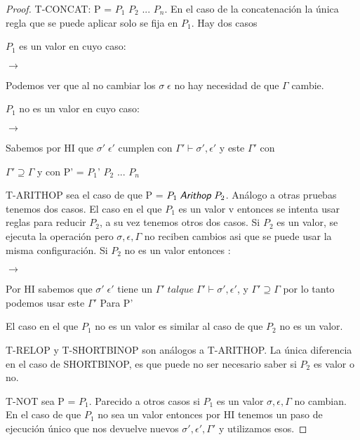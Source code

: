 \begin{proof}
T-CONCAT: P = $P_{1}$ $P_{2}$ ... $P_{n}$. En el caso de la concatenación la única regla que se puede aplicar solo se fija en $P_{1}$.
Hay dos casos

$P_{1}$ es un valor en cuyo caso: 

  $\rightarrow$ 

Podemos ver que al no cambiar los $\sigma \; \epsilon$ no hay necesidad de que $\Gamma$ cambie.

$P_{1}$ no es un valor en cuyo caso:  

  $\rightarrow$ 

Sabemos por HI que $\sigma' \; \epsilon'$ cumplen con $\Gamma' \vdash \sigma', \epsilon'$ y este $\Gamma'$ con 

$\Gamma' \supseteq  \Gamma$ y  con P' = $P_{1}$' $P_{2}$ ... $P_{n}$

T-ARITHOP sea el caso de que P = $P_{1} \; \textsf{\textit{Arithop}} \; P_{2}$. Análogo a otras pruebas tenemos dos casos.
El caso en el que $P_{1}$ es un valor v entonces se intenta usar reglas para reducir $P_{2}$, a su vez tenemos otros dos casos.
Si $P_{2}$ es un valor, se ejecuta la operación pero $\sigma, \epsilon, \Gamma$ no reciben cambios asi que se puede usar la misma configuración.
Si $P_{2}$ no es un valor entonces :

  $\rightarrow$  %

Por HI sabemos que $\sigma' \; \epsilon'$ tiene un $\Gamma' \; tal que \; \Gamma' \vdash \sigma', \epsilon'$,
 y $\Gamma' \supseteq  \Gamma$ por lo tanto podemos usar este $\Gamma'$ Para P'

El caso en el que $P_{1}$ no es un valor es similar al caso de que $P_{2}$ no es un valor.

T-RELOP y T-SHORTBINOP son análogos a T-ARITHOP. La única diferencia en el caso de SHORTBINOP, es que puede no ser necesario saber si $P_{2}$ es valor o no.

T-NOT  sea P =  $P_{1}$. Parecido a otros casos si $P_{1}$ es un valor $\sigma, \epsilon, \Gamma$ no cambian.
En el caso de que $P_{1}$ no sea un valor entonces por HI tenemos un paso de ejecución único que nos devuelve nuevos $\sigma', \epsilon', \Gamma'$ y utilizamos esos.


\end{proof}
